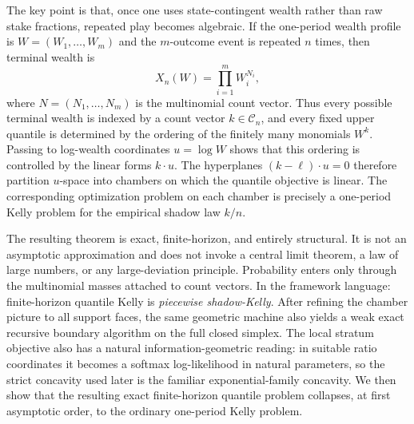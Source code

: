 \documentclass[11pt]{article}
\theoremstyle{definition}
\newcommand{\1}{\mathbf{1}}
\begin{document}
The key point is that, once one uses state-contingent wealth rather than raw stake fractions, repeated play becomes algebraic. If the one-period wealth profile is $W=(W_1,\dots,W_m)$ and the $m$-outcome event is repeated $n$ times, then terminal wealth is
\[
X_n(W)=\prod_{i=1}^m W_i^{N_i},
\]
where $N=(N_1,\dots,N_m)$ is the multinomial count vector. Thus every possible terminal wealth is indexed by a count vector $k\in\mathcal C_n$, and every fixed upper quantile is determined by the ordering of the finitely many monomials $W^k$. Passing to log-wealth coordinates $u=\log W$ shows that this ordering is controlled by the linear forms $k\cdot u$. The hyperplanes $(k-\ell)\cdot u=0$ therefore partition $u$-space into chambers on which the quantile objective is linear. The corresponding optimization problem on each chamber is precisely a one-period Kelly problem for the empirical shadow law $k/n$.

The resulting theorem is exact, finite-horizon, and entirely structural. It is not an asymptotic approximation and does not invoke a central limit theorem, a law of large numbers, or any large-deviation principle. Probability enters only through the multinomial masses attached to count vectors. In the framework language: finite-horizon quantile Kelly is \emph{piecewise shadow-Kelly}. After refining the chamber picture to all support faces, the same geometric machine also yields a weak exact recursive boundary algorithm on the full closed simplex. The local stratum objective also has a natural information-geometric reading: in suitable ratio coordinates it becomes a softmax log-likelihood in natural parameters, so the strict concavity used later is the familiar exponential-family concavity. We then show that the resulting exact finite-horizon quantile problem collapses, at first asymptotic order, to the ordinary one-period Kelly problem.
\end{document}
